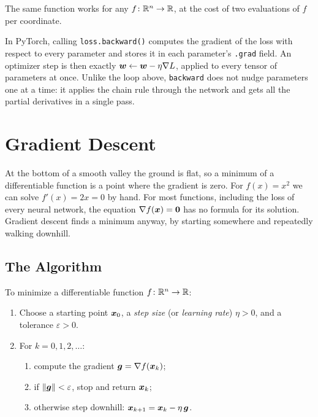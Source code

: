 The same function works for any $f\colon \mathbb{R}^n \to \mathbb{R}$, at the cost of two
evaluations of $f$ per coordinate.

\begin{aibox}
  In PyTorch, calling \texttt{loss.backward()} computes the gradient of the
  loss with respect to every parameter and stores it in each parameter's
  \texttt{.grad} field. An optimizer step is then exactly
  $\bm{w} \leftarrow \bm{w} - \eta \nabla L$, applied to every tensor of
  parameters at once. Unlike the loop above, \texttt{backward} does not
  nudge parameters one at a time: it applies the chain rule through the
  network and gets all the partial derivatives in a single pass.
\end{aibox}

\section{Gradient Descent}
\label{sec:ch02-gd}

At the bottom of a smooth valley the ground is flat, so a minimum of a
differentiable function is a point where the gradient is zero. For
$f(x) = x^2$ we can solve $f'(x) = 2x = 0$ by hand. For most functions,
including the loss of every neural network, the equation
$\nabla f(\bm{x}) = \bm{0}$ has no formula for its solution. Gradient
descent finds a minimum anyway, by starting somewhere and repeatedly
walking downhill.

\subsection{The Algorithm}
\label{sec:ch02-gd-algorithm}

To minimize a differentiable function $f\colon \mathbb{R}^n \to \mathbb{R}$:
\begin{enumerate}
  \item Choose a starting point $\bm{x}_0$, a \emph{step size} (or
    \emph{learning rate}) $\eta > 0$, and a tolerance $\varepsilon > 0$.
  \item For $k = 0, 1, 2, \dots$:
    \begin{enumerate}
      \item compute the gradient $\bm{g} = \nabla f(\bm{x}_k)$;
      \item if $\|\bm{g}\| < \varepsilon$, stop and return $\bm{x}_k$;
      \item otherwise step downhill: $\bm{x}_{k+1} = \bm{x}_k - \eta\,
        \bm{g}$.
    \end{enumerate}
\end{enumerate}

